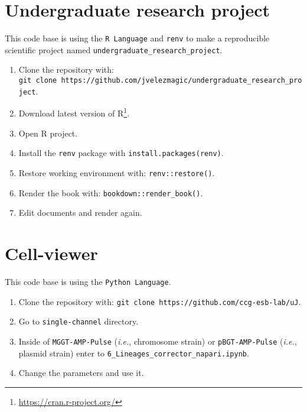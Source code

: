 \documentclass[
  12pt,
  a4paper,
  oneside]{krantz}
\providecommand{\tightlist}{%
  \setlength{\itemsep}{0pt}\setlength{\parskip}{0pt}}
\renewcommand{\href}[2]{#2\footnote{\url{#1}}}
\begin{document}
\hypertarget{undergraduate-research-project}{%
\section{Undergraduate research project}\label{undergraduate-research-project}}

This code base is using the \texttt{R\ Language} and \texttt{renv} to make a
reproducible scientific project named \texttt{undergraduate\_research\_project}.

\begin{enumerate}
\def\labelenumi{\arabic{enumi}.}
\tightlist
\item
  Clone the repository with:
  \texttt{git\ clone\ https://github.com/jvelezmagic/undergraduate\_research\_project}.
\item
  Download latest version of \href{https://cran.r-project.org/}{R}.
\item
  Open R project.
\item
  Install the \texttt{renv} package with \texttt{install.packages(\textquotesingle{}renv\textquotesingle{})}.
\item
  Restore working environment with: \texttt{renv::restore()}.
\item
  Render the book with: \texttt{bookdown::render\_book()}.
\item
  Edit documents and render again.
\end{enumerate}

\hypertarget{cell-viewer}{%
\section{Cell-viewer}\label{cell-viewer}}

This code base is using the \texttt{Python\ Language}.

\begin{enumerate}
\def\labelenumi{\arabic{enumi}.}
\tightlist
\item
  Clone the repository with:
  \texttt{git\ clone\ https://github.com/ccg-esb-lab/uJ}.
\item
  Go to \texttt{single-channel} directory.
\item
  Inside of \texttt{MGGT-AMP-Pulse} (\emph{i.e.}, chromosome strain) or
  \texttt{pBGT-AMP-Pulse} (\emph{i.e.}, plasmid strain) enter to
  \texttt{6\_Lineages\_corrector\_napari.ipynb}.
\item
  Change the parameters and use it.
\end{enumerate}
\end{document}
